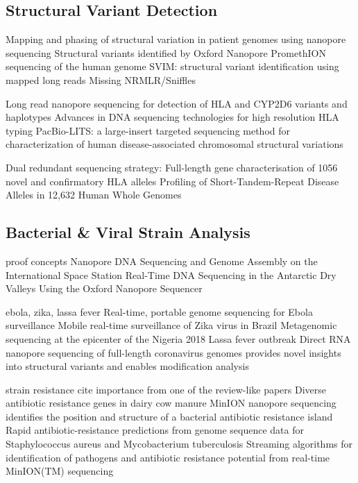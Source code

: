 \subsection{Structural Variant Detection}
\label{subsec:state_of_art:sv}

Mapping and phasing of structural variation in patient genomes using nanopore sequencing \cite{Stancu2017}
Structural variants identified by Oxford Nanopore PromethION sequencing of the human genome \cite{Coster2019}
SVIM: structural variant identification using mapped long reads \cite{Heller2019}
Missing NRMLR/Sniffles \cite{Sedlazeck2018}

Long read nanopore sequencing for detection of HLA and CYP2D6 variants and haplotypes \cite{Ammar2015}
Advances in DNA sequencing technologies for high resolution HLA typing \cite{Cereb2015}
PacBio-LITS: a large-insert targeted sequencing method for characterization of human disease-associated chromosomal structural variations \cite{Wang2015}

Dual redundant sequencing strategy: Full-length gene characterisation of 1056 novel and confirmatory HLA alleles \cite{Albrecht2017}
Profiling of Short-Tandem-Repeat Disease Alleles in 12,632 Human Whole Genomes \cite{Tang2017}




\subsection{Bacterial \& Viral Strain Analysis}
\label{subsec:state_of_art:strain}

proof concepts
Nanopore DNA Sequencing and Genome Assembly on the International Space Station \cite{Castro-Wallace2017}
Real-Time DNA Sequencing in the Antarctic Dry Valleys Using the Oxford Nanopore Sequencer \cite{Johnson2017}

ebola, zika, lassa fever
Real-time, portable genome sequencing for Ebola surveillance \cite{Quick2016}
Mobile real-time surveillance of Zika virus in Brazil \cite{Faria2016}
Metagenomic sequencing at the epicenter of the Nigeria 2018 Lassa fever outbreak \cite{Kafetzopoulou2019}
Direct RNA nanopore sequencing of full-length coronavirus genomes provides novel insights into structural variants and enables modification analysis \cite{Viehweger2019}

strain resistance
cite importance from one of the review-like papers
Diverse antibiotic resistance genes in dairy cow manure \cite{Wichmann2014}
MinION nanopore sequencing identifies the position and structure of a bacterial antibiotic resistance island \cite{Ashton2015}
Rapid antibiotic-resistance predictions from genome sequence data for Staphylococcus aureus and Mycobacterium tuberculosis \cite{Bradley2015}
Streaming algorithms for identification of pathogens and antibiotic resistance potential from real-time MinION(TM) sequencing \cite{Cao2016}

